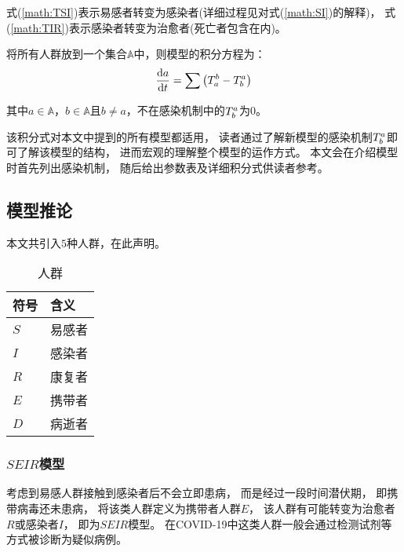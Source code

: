 \par 式(\ref{math:TSI})表示易感者转变为感染者(详细过程见对式(\ref{math:SI})的解释)，
式(\ref{math:TIR})表示感染者转变为治愈者(死亡者包含在内)。
\par 将所有人群放到一个集合$\mathbb{A}$中，则模型的积分方程为：
\begin{equation}
    \frac{\mathrm{d}a}{\mathrm{d}t} = \sum\left(T^{b}_{a}-T^{a}_{b}\right)
\end{equation}
\par 其中$a\in\mathbb{A}$，$b\in\mathbb{A}$且$b\not=a$，不在感染机制中的$T^{a}_{b}$为$0$。
\par 该积分式对本文中提到的所有模型都适用，
读者通过了解新模型的感染机制$T^{a}_{b}$即可了解该模型的结构，
进而宏观的理解整个模型的运作方式。
本文会在介绍模型时首先列出感染机制，
随后给出参数表及详细积分式供读者参考。
\subsection{模型推论}
\par 本文共引入$5$种人群，在此声明。
\begin{table}[H]
    \centering
    \caption{人群}
    \begin{tabular}{ll}
        \hline
        符号 & 含义   \\
        \hline
        $S$  & 易感者 \\
        $I$  & 感染者 \\
        $R$  & 康复者 \\
        $E$  & 携带者 \\
        $D$  & 病逝者 \\
        \hline
    \end{tabular}
\end{table}
\subsubsection{$SEIR$模型}
\par 考虑到易感人群接触到感染者后不会立即患病，
而是经过一段时间潜伏期，
即携带病毒还未患病，
将该类人群定义为携带者人群$E$，
该人群有可能转变为治愈者$R$或感染者$I$，
即为$SEIR$模型。
在COVID-19中这类人群一般会通过检测试剂等方式被诊断为疑似病例。
